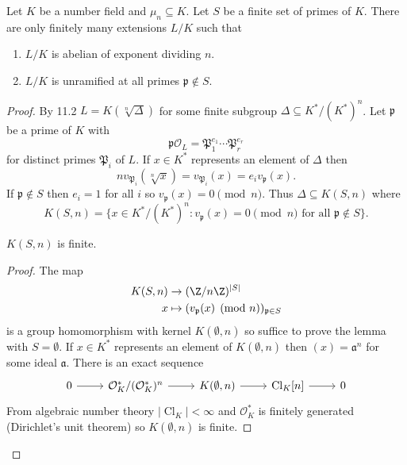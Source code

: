 \documentclass[a4paper]{article}
\theoremstyle{definition}
\theoremstyle{theorem}
\renewcommand*{\O}{\mathcal{O}}
\DeclareMathOperator{\Cl}{Cl} %
\begin{document}
\begin{proposition}
  Let \(K\) be a number field and \(\mu_n \subseteq K\). Let \(S\) be a finite set of primes of \(K\). There are only finitely many extensions \(L/K\) such that
  \begin{enumerate}
  \item \(L/K\) is abelian of exponent dividing \(n\).
  \item \(L/K\) is unramified at all primes \(\mathfrak p \notin S\).
  \end{enumerate}
\end{proposition}

\begin{proof}
  By 11.2 \(L = K(\sqrt[n]{\Delta})\) for some finite subgroup \(\Delta \subseteq K^*/(K^*)^n\). Let \(\mathfrak p\) be a prime of \(K\) with
  \[
    \mathfrak p \O_L = \mathfrak P_1^{e_1} \cdots \mathfrak P_r^{e_r}
  \]
  for distinct primes \(\mathfrak P_i\) of \(L\). If \(x \in K^*\) represents an element of \(\Delta\) then
  \[
    n v_{\mathfrak P_i}(\sqrt[n]{x}) = v_{\mathfrak P_i}(x) = e_i v_{\mathfrak p}(x).
  \]
  If \(\mathfrak p \notin S\) then \(e_i = 1\) for all \(i\) so \(v_{\mathfrak p}(x) = 0 \pmod n\). Thus \(\Delta \subseteq K(S, n)\) where
  \[
    K(S, n) = \{x \in K^*/(K^*)^n: v_{\mathfrak p}(x) = 0 \pmod n \text{ for all } \mathfrak p \notin S\}.
  \]

  \begin{lemma}
    \(K(S, n)\) is finite.
  \end{lemma}

  \begin{proof}
    The map
    \begin{align*}
      K(S, n) &\to (\Z/n\Z)^{|S|} \\
      x &\mapsto (v_{\mathfrak p}(x) \pmod n)_{\mathfrak p \in S}
    \end{align*}
    is a group homomorphism with kernel \(K(\emptyset, n)\) so suffice to prove the lemma with \(S = \emptyset\). If \(x \in K^*\) represents an element of \(K(\emptyset, n)\) then \((x) = \mathfrak a^n\) for some ideal \(\mathfrak a\). There is an exact sequence
    \[
      \begin{tikzcd}
        0 \ar[r] & \O_K^*/(\O_K^*)^n \ar[r] & K(\emptyset, n) \ar[r] & \Cl_K[n] \ar[r] & 0
      \end{tikzcd}
    \]
    From algebraic number theory \(|\Cl_K| < \infty\) and \(\O_K^*\) is finitely generated (Dirichlet's unit theorem) so \(K(\emptyset, n)\) is finite.
  \end{proof}
\end{proof}
\end{document}
